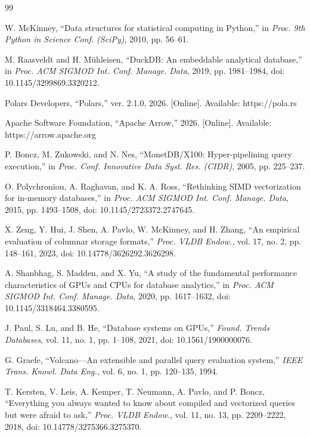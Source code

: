 \documentclass[conference,a4paper]{IEEEtran}
\begin{document}
\begin{thebibliography}{99}

W. McKinney, ``Data structures for statistical computing in Python,'' in \emph{Proc. 9th Python in Science Conf. (SciPy)}, 2010, pp. 56--61.

M. Raasveldt and H. M\"uhleisen, ``DuckDB: An embeddable analytical database,'' in \emph{Proc. ACM SIGMOD Int. Conf. Manage. Data}, 2019, pp. 1981--1984, doi: 10.1145/3299869.3320212.

Polars Developers, ``Polars,'' ver. 2.1.0, 2026. [Online]. Available: https://pola.rs

Apache Software Foundation, ``Apache Arrow,'' 2026. [Online]. Available: https://arrow.apache.org

P. Boncz, M. Zukowski, and N. Nes, ``MonetDB/X100: Hyper-pipelining query execution,'' in \emph{Proc. Conf. Innovative Data Syst. Res. (CIDR)}, 2005, pp. 225--237.

O. Polychroniou, A. Raghavan, and K. A. Ross, ``Rethinking SIMD vectorization for in-memory databases,'' in \emph{Proc. ACM SIGMOD Int. Conf. Manage. Data}, 2015, pp. 1493--1508, doi: 10.1145/2723372.2747645.

X. Zeng, Y. Hui, J. Shen, A. Pavlo, W. McKinney, and H. Zhang, ``An empirical evaluation of columnar storage formats,'' \emph{Proc. VLDB Endow.}, vol. 17, no. 2, pp. 148--161, 2023, doi: 10.14778/3626292.3626298.

A. Shanbhag, S. Madden, and X. Yu, ``A study of the fundamental performance characteristics of GPUs and CPUs for database analytics,'' in \emph{Proc. ACM SIGMOD Int. Conf. Manage. Data}, 2020, pp. 1617--1632, doi: 10.1145/3318464.3380595.

J. Paul, S. Lu, and B. He, ``Database systems on GPUs,'' \emph{Found. Trends Databases}, vol. 11, no. 1, pp. 1--108, 2021, doi: 10.1561/1900000076.

G. Graefe, ``Volcano---An extensible and parallel query evaluation system,'' \emph{IEEE Trans. Knowl. Data Eng.}, vol. 6, no. 1, pp. 120--135, 1994.

T. Kersten, V. Leis, A. Kemper, T. Neumann, A. Pavlo, and P. Boncz, ``Everything you always wanted to know about compiled and vectorized queries but were afraid to ask,'' \emph{Proc. VLDB Endow.}, vol. 11, no. 13, pp. 2209--2222, 2018, doi: 10.14778/3275366.3275370.


\end{thebibliography}
\end{document}
